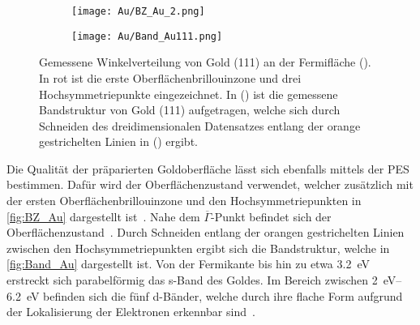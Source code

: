         \begin{figure}
            \centering
            \begin{subfigure}[t]{0.34\textwidth}
                \centering
                \texttt{[image: Au/BZ\_Au\_2.png]}
                \subcaption{}
                \label{fig:BZ_Au}
            \end{subfigure}
            \begin{subfigure}[t]{0.62\textwidth}
                \centering
                \texttt{[image: Au/Band\_Au111.png]}
                \subcaption{}
                \label{fig:Band_Au}
            \end{subfigure}
            \caption{Gemessene Winkelverteilung von Gold (111) an der Fermifläche ().
            In rot ist die erste Oberflächenbrillouinzone und drei Hochsymmetriepunkte eingezeichnet.
            In () ist die gemessene Bandstruktur von Gold (111) aufgetragen, welche sich durch Schneiden des dreidimensionalen Datensatzes entlang der orange gestrichelten Linien in () ergibt.}
        \end{figure}
        Die Qualität der präparierten Goldoberfläche lässt sich ebenfalls mittels der PES bestimmen.
        Dafür wird der Oberflächenzustand verwendet, welcher zusätzlich mit der ersten Oberflächenbrillouinzone und den Hochsymmetriepunkten in \autoref{fig:BZ_Au} dargestellt ist~\cite{Au_3}.
        Nahe dem $\overline{\Gamma}$-Punkt befindet sich der Oberflächenzustand~\cite{Au_1}.
        Durch Schneiden entlang der orangen gestrichelten Linien zwischen den Hochsymmetriepunkten ergibt sich die Bandstruktur, welche in \autoref{fig:Band_Au} dargestellt ist.
        Von der Fermikante bis hin zu etwa \SI{3.2}{\electronvolt} erstreckt sich parabelförmig das s-Band des Goldes.
        Im Bereich zwischen \SIrange{2}{6.2}{\electronvolt} befinden sich die fünf d-Bänder, welche durch ihre flache Form aufgrund der Lokalisierung der Elektronen erkennbar sind~\cite{yan_topological_2015}.

